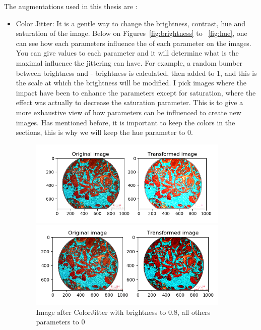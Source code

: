 The augmentations used in this thesis are :
\begin{itemize}
    \item Color Jitter: It is a gentle way to change the brightness, contrast, hue and saturation of the image. Below on Figures~\ref{fig:brightness} to ~\ref{fig:hue}, one can see how each parameters influence the of each parameter on the images. You can give values to each parameter and it will determine what is the maximal influence the jittering can have. For example, a random bumber between brightness and - brightness is calculated, then added to 1, and this is the scale at which the brightness will be modified. I pick images where the impact have been to enhance the parameters except for saturation, where the effect was actually to decrease the saturation parameter. This is to give a more exhaustive view of how parameters can be influenced to create new images. 
    Has mentioned before, it is important to keep the colors in the sections, this is why we will keep the hue parameter to 0.
    \begin{figure}
    \centering
    \begin{minipage}{0.4\textwidth}
        \centering
        \includegraphics[width=0.9\textwidth]{figures/03-bightness08.PNG} %
        \caption{Image after ColorJitter with brightness to 0.8, all others parameters to 0}\label{fig:classes}
    \end{minipage}
    \begin{minipage}{0.4\textwidth}
        \centering
        \includegraphics[width=0.9\textwidth]{figures/03-contrast1.PNG} %

\end{minipage}
\end{figure}
\end{itemize}
